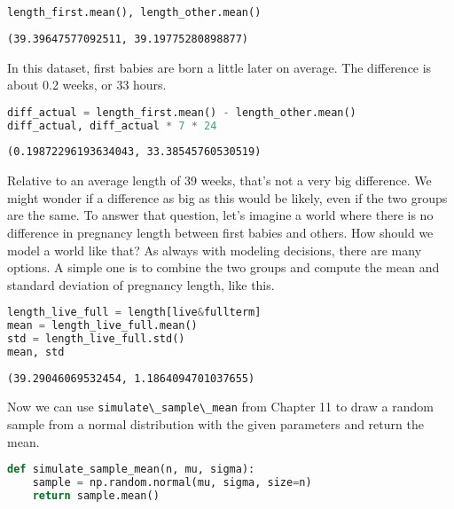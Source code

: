 \begin{lstlisting}[language=Python,style=source]
length_first.mean(), length_other.mean()
\end{lstlisting}

\begin{lstlisting}[style=output]
(39.39647577092511, 39.19775280898877)
\end{lstlisting}

In this dataset, first babies are born a little later on average. The
difference is about 0.2 weeks, or 33 hours.

\begin{lstlisting}[language=Python,style=source]
diff_actual = length_first.mean() - length_other.mean()
diff_actual, diff_actual * 7 * 24
\end{lstlisting}

\begin{lstlisting}[style=output]
(0.19872296193634043, 33.38545760530519)
\end{lstlisting}

Relative to an average length of 39 weeks, that's not a very big
difference. We might wonder if a difference as big as this would be
likely, even if the two groups are the same. To answer that question,
let's imagine a world where there is no difference in pregnancy length
between first babies and others. How should we model a world like that?
As always with modeling decisions, there are many options. A simple one
is to combine the two groups and compute the mean and standard deviation
of pregnancy length, like this.

\begin{lstlisting}[language=Python,style=source]
length_live_full = length[live&fullterm]
mean = length_live_full.mean()
std = length_live_full.std()
mean, std
\end{lstlisting}

\begin{lstlisting}[style=output]
(39.29046069532454, 1.1864094701037655)
\end{lstlisting}

\pagebreak

Now we can use \passthrough{\lstinline!simulate\_sample\_mean!} from
Chapter 11 to draw a random sample from a normal distribution with the
given parameters and return the mean.

\begin{lstlisting}[language=Python,style=source]
def simulate_sample_mean(n, mu, sigma):
    sample = np.random.normal(mu, sigma, size=n)
    return sample.mean()
\end{lstlisting}

